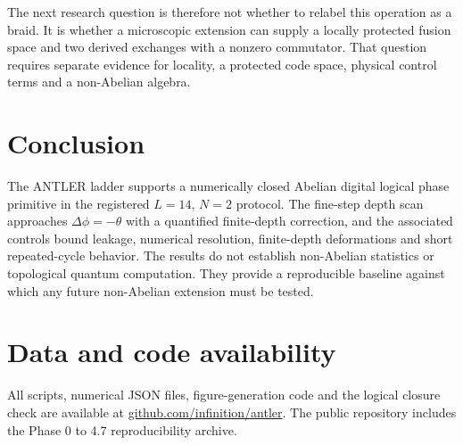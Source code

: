 \documentclass[11pt]{article}
\begin{document}
The next research question is therefore not whether to relabel this operation
as a braid. It is whether a microscopic extension can supply a locally
protected fusion space and two derived exchanges with a nonzero commutator.
That question requires separate evidence for locality, a protected code space,
physical control terms and a non-Abelian algebra.

\section{Conclusion}

The ANTLER ladder supports a numerically closed Abelian digital logical phase
primitive in the registered $L=14$, $N=2$ protocol. The fine-step depth scan
approaches $\Delta\phi=-\theta$ with a quantified finite-depth correction,
and the associated controls bound leakage, numerical resolution, finite-depth
deformations and short repeated-cycle behavior. The results do not establish
non-Abelian statistics or topological quantum computation. They provide a
reproducible baseline against which any future non-Abelian extension must be
tested.

\section*{Data and code availability}

All scripts, numerical JSON files, figure-generation code and the logical
closure check are available at
\href{https://github.com/infinition/antler}{github.com/infinition/antler}.
The public repository includes the Phase 0 to 4.7 reproducibility archive.



\end{document}
